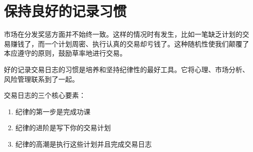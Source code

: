 \chapter{保持良好的记录习惯}
市场在分发奖惩方面并不始终一致。这样的情况时有发生，比如一笔缺乏计划的交易赚钱了，而一个计划周密、执行认真的交易却亏钱了。这种随机性使我们颠覆了本应遵守的原则，鼓励草率地进行交易。

好的记录交易日志的习惯是培养和坚持纪律性的最好工具。它将心理、市场分析、风险管理联系到了一起。

交易日志的三个核心要素：
\begin{enumerate}
    \item 纪律的第一步是完成功课
    \item 纪律的进阶是写下你的交易计划
    \item 纪律的高潮是执行这些计划并且完成交易日志
\end{enumerate}
